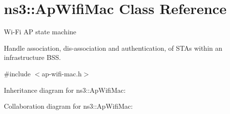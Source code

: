 \hypertarget{classns3_1_1ApWifiMac}{}\section{ns3\+:\+:Ap\+Wifi\+Mac Class Reference}
\label{classns3_1_1ApWifiMac}


Wi-\/\+Fi AP state machine

Handle association, dis-\/association and authentication, of S\+T\+As within an infrastructure B\+SS.  




{\ttfamily \#include $<$ap-\/wifi-\/mac.\+h$>$}



Inheritance diagram for ns3\+:\+:Ap\+Wifi\+Mac\+:


Collaboration diagram for ns3\+:\+:Ap\+Wifi\+Mac\+:
